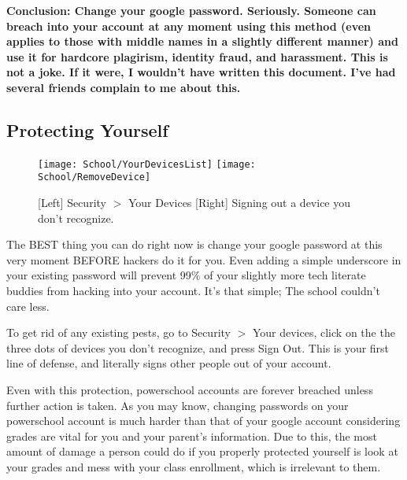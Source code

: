 \textbf{Conclusion: Change your google password. Seriously. Someone can breach into your account at any moment using this method (even applies to those with middle names in a slightly different manner) and use it for hardcore plagirism, identity fraud, and harassment. This is not a joke. If it were, I wouldn't have written this document. I've had several friends complain to me about this.}

\subsection{Protecting Yourself}

\begin{figure}[h]
    \centering
    \texttt{[image: School/YourDevicesList]}
    \texttt{[image: School/RemoveDevice]}
    \caption{
        [Left] Security $>$ Your Devices [Right] Signing out a device you don't recognize.
    }
\end{figure}

The BEST thing you can do right now is change your google password at this very moment BEFORE hackers do it for you. Even adding a simple underscore in your existing password will prevent 99\% of your slightly more tech literate buddies from hacking into your account. It's that simple; The school couldn't care less.

To get rid of any existing pests, go to Security $>$ Your devices, click on the the three dots of devices you don't recognize, and press Sign Out. This is your first line of defense, and literally signs other people out of your account.

Even with this protection, powerschool accounts are forever breached unless further action is taken. As you may know, changing passwords on your powerschool account is much harder than that of your google account considering grades are vital for you and your parent's information. Due to this, the most amount of damage a person could do if you properly protected yourself is look at your grades and mess with your class enrollment, which is irrelevant to them.
